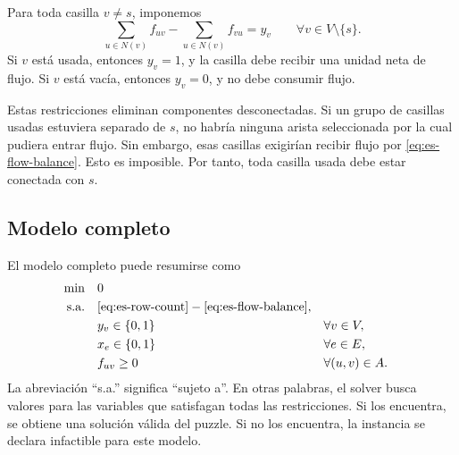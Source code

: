Para toda casilla \(v \neq s\), imponemos
\begin{equation}
    \sum_{u \in N(v)} f_{uv}
    -
    \sum_{u \in N(v)} f_{vu}
    =
    y_v
    \qquad \forall v \in V \setminus \{s\}.
    \label{eq:es-flow-balance}
\end{equation}
Si \(v\) está usada, entonces \(y_v=1\), y la casilla debe recibir una unidad neta de flujo. Si \(v\) está vacía, entonces \(y_v=0\), y no debe consumir flujo.

Estas restricciones eliminan componentes desconectadas. Si un grupo de casillas usadas estuviera separado de \(s\), no habría ninguna arista seleccionada por la cual pudiera entrar flujo. Sin embargo, esas casillas exigirían recibir flujo por \eqref{eq:es-flow-balance}. Esto es imposible. Por tanto, toda casilla usada debe estar conectada con \(s\).

\subsection{Modelo completo}

El modelo completo puede resumirse como
\[
\begin{aligned}
    \min \quad & 0 \\
    \text{s.a.} \quad
    & \eqref{eq:es-row-count}-\eqref{eq:es-flow-balance}, \\
    & y_v \in \{0,1\} && \forall v \in V, \\
    & x_e \in \{0,1\} && \forall e \in E, \\
    & f_{uv} \geq 0 && \forall (u,v) \in A.
\end{aligned}
\]
La abreviación ``s.a.'' significa ``sujeto a''. En otras palabras, el solver busca valores para las variables que satisfagan todas las restricciones. Si los encuentra, se obtiene una solución válida del puzzle. Si no los encuentra, la instancia se declara infactible para este modelo.
